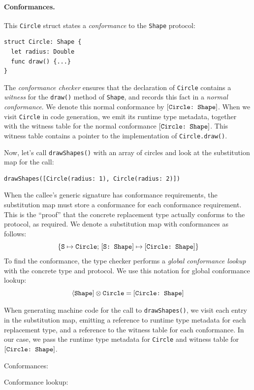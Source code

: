 \documentclass[../generics]{subfiles}
\begin{document}
\paragraph{Conformances.} This \texttt{Circle} struct states a \emph{conformance} to the \texttt{Shape} protocol:
\begin{Verbatim}
struct Circle: Shape {
  let radius: Double
  func draw() {...}
}
\end{Verbatim}
The \emph{conformance checker} ensures that the declaration of \texttt{Circle} contains a \emph{witness} for the \texttt{draw()} method of \texttt{Shape}, and records this fact in a \emph{normal conformance}. We denote this normal conformance by $[\texttt{Circle:~Shape}]$. When we visit \texttt{Circle} in code generation, we emit its runtime type metadata, together with the witness table for the normal conformance $[\texttt{Circle:~Shape}]$. This witness table contains a pointer to the implementation of \texttt{Circle.draw()}.

Now, let's call \verb|drawShapes()| with an array of circles and look at the substitution map for the call:
\begin{Verbatim}
drawShapes([Circle(radius: 1), Circle(radius: 2)])
\end{Verbatim}
When the callee's generic signature has conformance requirements, the substitution map must store a conformance for each conformance requirement. This is the ``proof'' that the concrete replacement type actually conforms to the protocol, as required. We denote a substitution map with conformances as follows:
\[\{\texttt{S} \mapsto \texttt{Circle};\,[\texttt{S:~Shape}] \mapsto [\texttt{Circle:~Shape}]\}\]
To find the conformance, the type checker performs a \emph{global conformance lookup} with the concrete type and protocol. We use this notation for global conformance lookup:
\[\langle\texttt{Shape}]\otimes\texttt{Circle}=[\texttt{Circle:~Shape}]\]

When generating machine code for the call to \verb|drawShapes()|, we visit each entry in the substitution map, emitting a reference to runtime type metadata for each replacement type, and a reference to the witness table for each conformance. In our case, we pass the runtime type metadata for \texttt{Circle} and witness table for $[\texttt{Circle:~Shape}]$.

\begin{MoreDetails}
\item Conformances: 
\item Conformance lookup: 
\end{MoreDetails}
\end{document}
